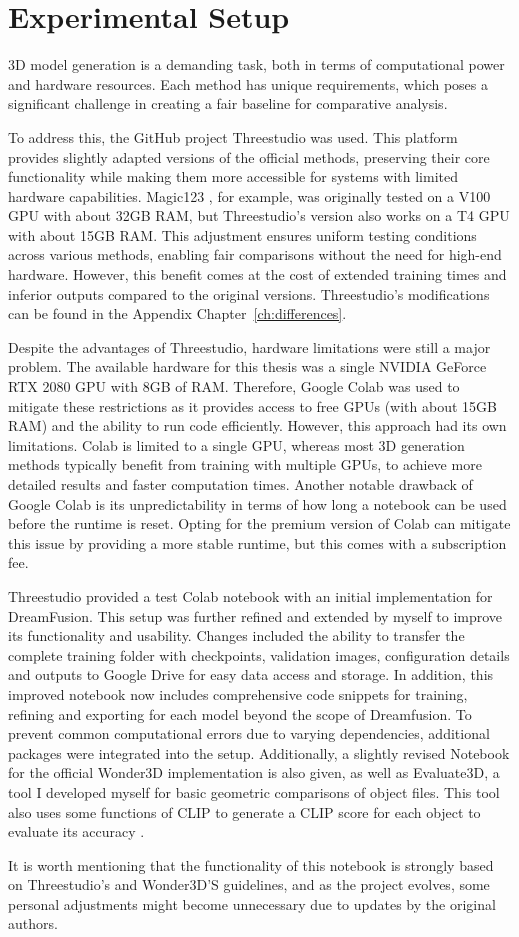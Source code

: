 \section{Experimental Setup}\label{Setup}

3D model generation is a demanding task, both in terms of computational power and hardware resources. Each method has unique requirements, which poses a significant challenge in creating a fair baseline for comparative analysis.

To address this, the GitHub project Threestudio \citep{threestudio2023} was used. This platform provides slightly adapted versions of the official methods, preserving their core functionality while making them more accessible for systems with limited hardware capabilities. Magic123 \citep{qian2023magic123}, for example, was originally tested on a V100 GPU with about 32GB RAM, but Threestudio's version also works on a T4 GPU with about 15GB RAM\@. This adjustment ensures uniform testing conditions across various methods, enabling fair comparisons without the need for high-end hardware. However, this benefit comes at the cost of extended training times and inferior outputs compared to the original versions. Threestudio's modifications can be found in the Appendix Chapter~\ref{ch:differences}. 

Despite the advantages of Threestudio, hardware limitations were still a major problem. The available hardware for this thesis was a single NVIDIA GeForce RTX 2080 GPU with 8GB of RAM\@. Therefore, Google Colab \citep{googlecolab} was used to mitigate these restrictions as it provides access to free GPUs (with about 15GB RAM) and the ability to run code efficiently. However, this approach had its own limitations. Colab is limited to a single GPU, whereas most 3D generation methods typically benefit from training with multiple GPUs, to achieve more detailed results and faster computation times. Another notable drawback of Google Colab is its unpredictability in terms of how long a notebook can be used before the runtime is reset. Opting for the premium version of Colab can mitigate this issue by providing a more stable runtime, but this comes with a subscription fee.

Threestudio provided a test Colab notebook with an initial implementation for DreamFusion. This setup was further refined and extended by myself to improve its functionality and usability. Changes included the ability to transfer the complete training folder with checkpoints, validation images, configuration details and outputs to Google Drive for easy data access and storage. In addition, this improved notebook now includes comprehensive code snippets for training, refining and exporting for each model beyond the scope of Dreamfusion. To prevent common computational errors due to varying dependencies, additional packages were integrated into the setup. 
Additionally, a slightly revised Notebook for the official Wonder3D implementation \citep{long2023wonder3d} is also given, as well as Evaluate3D, a tool I developed myself for basic geometric comparisons of object files. This tool also uses some functions of CLIP to generate a CLIP score for each object to evaluate its accuracy \citep{radfordCLIP}.

It is worth mentioning that the functionality of this notebook is strongly based on Threestudio's and Wonder3D'S guidelines, and as the project evolves, some personal adjustments might become unnecessary due to updates by the original authors.